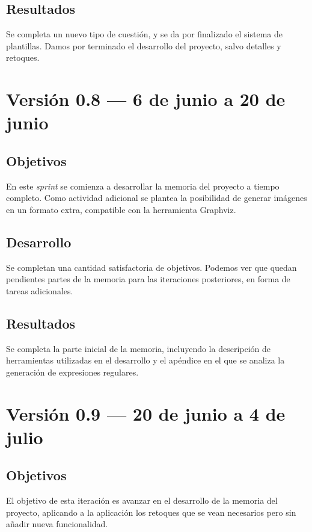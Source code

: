 
\subsection{Resultados}
Se completa un nuevo tipo de cuestión, y se da por finalizado el sistema de plantillas.
Damos por terminado el desarrollo del proyecto, salvo detalles y retoques.

\section{Versión 0.8 --- 6 de junio a 20 de junio}
\subsection{Objetivos}
En este \emph{sprint} se comienza a desarrollar la memoria del proyecto a tiempo completo.
Como actividad adicional se plantea la posibilidad de generar imágenes en un formato extra, compatible con la herramienta Graphviz.

\subsection{Desarrollo}
Se completan una cantidad satisfactoria de objetivos.
Podemos ver que quedan pendientes partes de la memoria para las iteraciones posteriores, en forma de tareas adicionales.


\subsection{Resultados}
Se completa la parte inicial de la memoria, incluyendo la descripción de herramientas utilizadas en el desarrollo y el apéndice en el que se analiza la generación de expresiones regulares.

\section{Versión 0.9 --- 20 de junio a 4 de julio}
\subsection{Objetivos}
El objetivo de esta iteración es avanzar en el desarrollo de la memoria del proyecto, aplicando a la aplicación los retoques que se vean necesarios pero sin añadir nueva funcionalidad.

